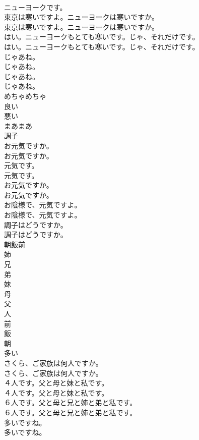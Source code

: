 \documentclass[8pt]{extreport}
\begin{document}
\begin{CJK}{UTF8}{min}
\\	ニューヨークです。 
\\	東京は寒いですよ。ニューヨークは寒いですか。	
\\	東京は寒いですよ。ニューヨークは寒いですか。 
\\	はい。ニューヨークもとても寒いです。じゃ、それだけです。	
\\	はい。ニューヨークもとても寒いです。じゃ、それだけです。 
\\	じゃあね。	
\\	じゃあね。 
\\	じゃあね。	
\\	じゃあね。 
\\	めちゃめちゃ
\\	良い
\\	悪い
\\	まあまあ
\\	調子
\\	お元気ですか。	
\\	お元気ですか。 
\\	元気です。	
\\	元気です。 
\\	お元気ですか。	
\\	お元気ですか。 
\\	お陰様で、元気ですよ。	
\\	お陰様で、元気ですよ。 
\\	調子はどうですか。	
\\	調子はどうですか。 
\\	朝飯前
\\	姉
\\	兄
\\	弟
\\	妹
\\	母
\\	父
\\	人
\\	前
\\	飯
\\	朝
\\	多い
\\	さくら、ご家族は何人ですか。	
\\	さくら、ご家族は何人ですか。 
\\	４人です。父と母と妹と私です。	
\\	４人です。父と母と妹と私です。 
\\	６人です。父と母と兄と姉と弟と私です。	
\\	６人です。父と母と兄と姉と弟と私です。 
\\	多いですね。	
\\	多いですね。 

\end{CJK}
\end{document}

